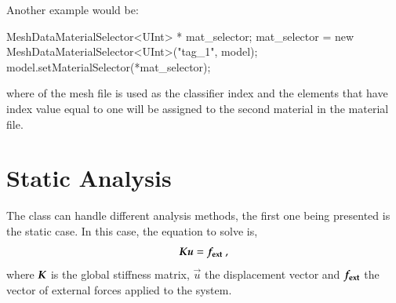 Another example would be:

\begin{cpp}
  MeshDataMaterialSelector<UInt> * mat_selector;
  mat_selector = new MeshDataMaterialSelector<UInt>("tag_1", model);
  model.setMaterialSelector(*mat_selector);
\end{cpp}

where  of the mesh file is used as the classifier index
and the elements that have index value equal to one will be assigned
to the second material in the material file.


\section{Static Analysis\label{sect:smm:static}}

The  class can handle different analysis
methods, the first one being presented is the static case.  In this
case, the equation to solve is,
\begin{equation}
  \label{eqn:smm:static} \boldsymbol{K} \boldsymbol{u} =
  \boldsymbol{f_{{\mathrm{ext}}}}~,
\end{equation}
where $\boldsymbol{K}$ is the global stiffness matrix, $\vec{u}$ the
displacement vector and $\boldsymbol{f_{{\mathrm{ext}}}}$ the vector of external
forces applied to the system.

